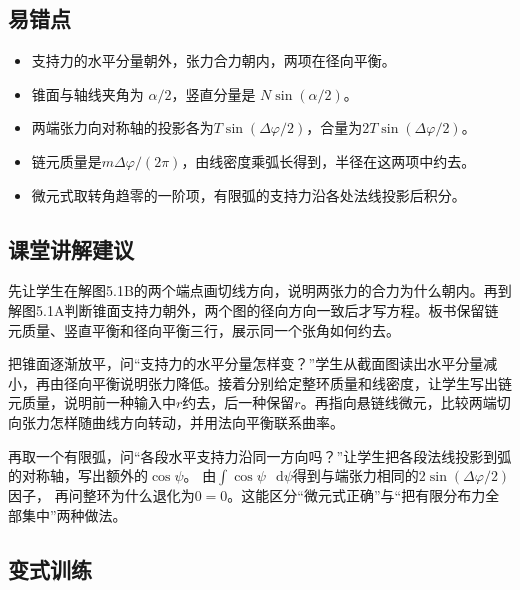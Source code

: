 \documentclass[UTF8,fontset=fandol,a4paper,11pt]{ctexart}
\newcommand{\dd}{\mathop{}\!\mathrm{d}}
\begin{document}


\subsection*{易错点}

\begin{itemize}\item 支持力的水平分量朝外，张力合力朝内，两项在径向平衡。\item 锥面与轴线夹角为 $\alpha/2$，竖直分量是 $N\sin(\alpha/2)$。\item 两端张力向对称轴的投影各为$T\sin(\Delta\varphi/2)$，合量为$2T\sin(\Delta\varphi/2)$。\item 链元质量是$m\Delta\varphi/(2\pi)$，由线密度乘弧长得到，半径在这两项中约去。\item 微元式取转角趋零的一阶项，有限弧的支持力沿各处法线投影后积分。\end{itemize}



\subsection*{课堂讲解建议}

先让学生在解图5.1B的两个端点画切线方向，说明两张力的合力为什么朝内。再到解图5.1A判断锥面支持力朝外，两个图的径向方向一致后才写方程。板书保留链元质量、竖直平衡和径向平衡三行，展示同一个张角如何约去。

把锥面逐渐放平，问“支持力的水平分量怎样变？”学生从截面图读出水平分量减小，再由径向平衡说明张力降低。接着分别给定整环质量和线密度，让学生写出链元质量，说明前一种输入中$r$约去，后一种保留$r$。再指向悬链线微元，比较两端切向张力怎样随曲线方向转动，并用法向平衡联系曲率。

再取一个有限弧，问“各段水平支持力沿同一方向吗？”让学生把各段法线投影到弧的对称轴，写出额外的$\cos\psi$。
由$\int\cos\psi\,\dd\psi$得到与端张力相同的$2\sin(\Delta\varphi/2)$因子，
再问整环为什么退化为$0=0$。这能区分“微元式正确”与“把有限分布力全部集中”两种做法。



\subsection*{变式训练}
\end{document}
